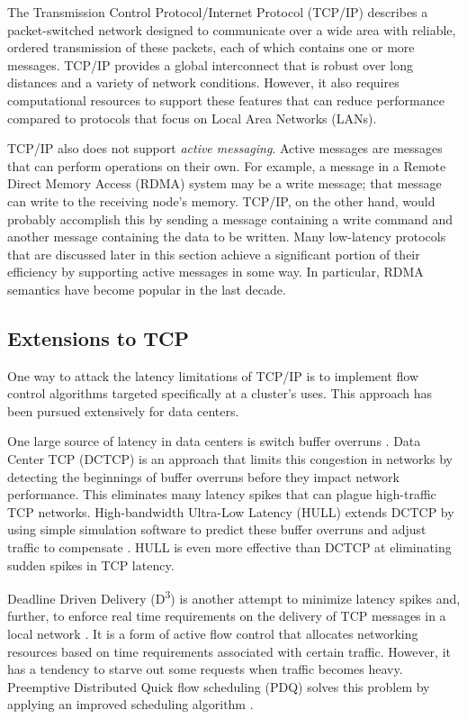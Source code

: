 \documentclass[11pt]{book}
\begin{document}
The Transmission Control Protocol/Internet Protocol (TCP/IP) describes a
packet-switched network designed to communicate over a wide area with reliable,
ordered transmission of these packets, each of which contains one or more
messages. TCP/IP provides a global interconnect that is robust over long
distances and a variety of network conditions. However, it also requires
computational resources to support these features that can reduce performance
compared to protocols that focus on Local Area Networks (LANs).

TCP/IP also does not support \textit{active messaging}. Active messages are
messages that can perform operations on their own. For example, a message in a
Remote Direct Memory Access (RDMA) system may be a write message; that message
can write to the receiving node's memory. TCP/IP, on the other hand, would
probably accomplish this by sending a message containing a write command and
another message containing the data to be written. Many low-latency protocols
that are discussed later in this section achieve a significant portion of their
efficiency by supporting active messages in some way. In particular, RDMA
semantics have become popular in the last decade.

\subsection{\textbf{Extensions to TCP}}

One way to attack the latency limitations of TCP/IP is to implement flow control
algorithms targeted specifically at a cluster's uses. This approach has been
pursued extensively for data centers.

One large source of latency in data centers is switch buffer overruns
\cite{liu-13}. Data Center TCP (DCTCP) is an approach that limits this
congestion in networks by detecting the beginnings of buffer overruns before they impact
network performance. This eliminates many latency spikes that can plague
high-traffic TCP networks. High-bandwidth Ultra-Low Latency (HULL) extends DCTCP
by using simple simulation software to predict these buffer overruns and adjust
traffic to compensate \cite{liu-13}. HULL is even more effective than DCTCP at
eliminating sudden spikes in TCP latency.

Deadline Driven Delivery (D\textsuperscript{3}) is another attempt to minimize latency spikes
and, further, to enforce real time requirements on the delivery of TCP messages
in a local network \cite{liu-13}. It is a form of active flow control that allocates
networking resources based on time requirements associated with certain
traffic. However, it has a tendency to starve out some requests when traffic
becomes heavy. Preemptive Distributed Quick flow scheduling (PDQ) solves this
problem by applying an improved scheduling algorithm \cite{liu-13}.
\end{document}
